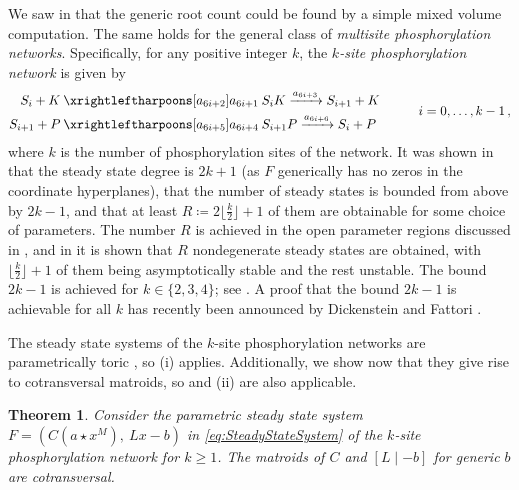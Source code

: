 \documentclass[11pt,reqno,a4paper]{amsart}
\numberwithin{equation}{section}
\theoremstyle{theoremstyle}
\newtheorem{theorem}{Theorem}[section]
\theoremstyle{examplestyle}
\begin{document}
We saw in  that the generic root count could be found by a simple mixed volume computation. The same holds for the general class of \emph{multisite phosphorylation networks}. Specifically, for any positive integer $k$, the \emph{$k$-site phosphorylation network} is given by
\begin{align}\label{eq:ksite}
\begin{split}
S_{i} + K \:\xrightleftharpoons[a_{6i+2}]{a_{6i+1}}\: & S_{i}K \xrightarrow{a_{6i+3}} S_{i+1} + K  \\
S_{i+1} + P \:\xrightleftharpoons[a_{6i+5}]{a_{6i+4}}\: & S_{i+1}P \xrightarrow{a_{6i+6}} S_{i} + P 
\end{split}
\qquad \quad i =0,\dots,k-1\,,
\end{align}
where $k$ is the number of phosphorylation sites of the network. It was shown in \cite{WangSontag} that the steady state degree is $2k+1$ (as $F$ generically has  no zeros in the coordinate hyperplanes), that  the number of  steady states is bounded from above by $2k-1$, and that at least $R\coloneqq 2\lfloor \tfrac{k}{2} \rfloor + 1$ of them are obtainable for some choice of parameters. 
The number $R$ is achieved in the open parameter regions discussed in \cite{GiaroliRischterPerezDickenstein}, and   in \cite{rendall:unlimited} it is shown that $R$ nondegenerate steady states are obtained, with $\lfloor \tfrac{k}{2} \rfloor + 1$ of them being asymptotically stable and the rest unstable. 
The bound $2k-1$ is achieved for $k\in\{2,3,4\}$; see \cite{FlockerziHolsteinConradi}. A proof that  the  bound $2k - 1$  is achievable for all $k$ has recently been announced by Dickenstein and Fattori \cite{Fattori}. 

The steady state systems of the $k$-site phosphorylation networks are parametrically toric \cite{PerezMillanDickensteinShiuConradi}, so (i) applies. Additionally, we show now that they give rise to cotransversal matroids, so    and (ii) are also applicable.


\begin{theorem}\label{thm:cotransversal_ksite}
Consider the parametric steady state system $F=(C (a \star x^M),\: L x - b)$ in \eqref{eq:SteadyStateSystem} of the 
$k$-site phosphorylation network for $k\geq 1$. The matroids of $C$ and $[ L \mid -b]$ for generic $b$ are cotransversal.
\end{theorem}
\end{document}
